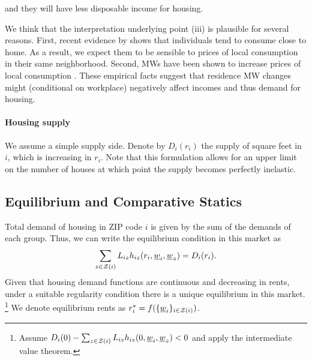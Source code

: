 and they will have less disposable income for housing.

We think that the interpretation underlying point (iii) is plausible for several 
reasons.
First, recent evidence by \textcite{MiyauchiEtAl2021} shows that individuals tend 
to consume close to home.
As a result, we expect them to be sensible to prices of local consumption in their 
same neighborhood.
Second, MWs have been shown to increase prices of local consumption 
\parencite[e.g.,][]{AllegrettoReich2018, Leung2021}.
These empirical facts suggest that residence MW changes might (conditional on workplace)
negatively affect incomes and thus demand for housing.

\paragraph{Housing supply}

We assume a simple supply side. Denote by $D_i(r_i)$ the supply of square feet in 
$i$, which is increasing in $r_i$.
Note that this formulation allows for an upper limit on the number of houses at 
which point the supply becomes perfectly inelastic.

\subsection{Equilibrium and Comparative Statics}

Total demand of housing in ZIP code $i$ is given by the sum of the demands of each group. 
Thus, we can write the equilibrium condition in this market as
\begin{equation}\label{eq:equilibrium}
	\sum_{z\in\mathcal{Z}(i)} L_{iz} h_{iz} (r_i, \underline{w}_i, \underline{w}_z) = D_i(r_i) .
\end{equation}
Given that housing demand functions are continuous and decreasing in rents, 
under a suitable regularity condition there is a unique equilibrium in this market.%
\footnote{Assume $D_i(0) - \sum_{z\in\mathcal{Z}(i)} L_{iz} h_{iz} (0, \underline{w}_i, \underline{w}_z) < 0$
and apply the intermediate value theorem.}
We denote equilibrium rents as $r^*_i = f(\{\underline{w}_i\}_{i\in\mathcal{Z}(i)})$.

